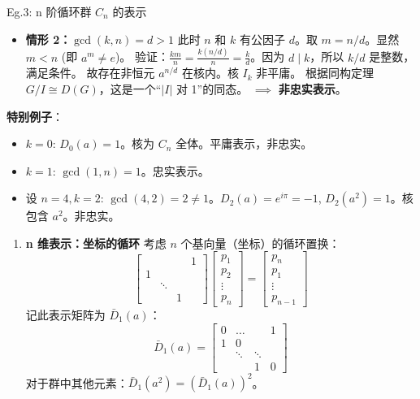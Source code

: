 \begin{example}{Eg.3: n 阶循环群 $C_n$ 的表示}
\begin{enumerate}
\begin{itemize}
        \item \textbf{情形 2：$\gcd(k, n) = d > 1$}
        此时 $n$ 和 $k$ 有公因子 $d$。取 $m = n/d$。显然 $m < n$ (即 $a^m \neq e$)。
        验证：$\frac{k m}{n} = \frac{k (n/d)}{n} = \frac{k}{d}$。因为 $d \mid k$，所以 $k/d$ 是整数，满足条件。
        故存在非恒元 $a^{n/d}$ 在核内。核 $I_k$ 非平庸。
        根据同构定理 $G/I \cong D(G)$，这是一个“$|I|$ 对 1”的同态。
        $\implies$ \textbf{非忠实表示}。
    \end{itemize}
    
    \textbf{特别例子}：
    \begin{itemize}
        \item $k=0$: $D_0(a)=1$。核为 $C_n$ 全体。平庸表示，非忠实。
        \item $k=1$: $\gcd(1, n)=1$。忠实表示。
        \item 设 $n=4, k=2$: $\gcd(4,2)=2 \neq 1$。$D_2(a) = e^{i\pi} = -1$, $D_2(a^2) = 1$。核包含 $a^2$。非忠实。
    \end{itemize}


    \end{enumerate}
    \begin{enumerate}
        \item \textbf{n 维表示：坐标的循环}
    考虑 $n$ 个基向量（坐标）的循环置换：
    \begin{equation}
        \begin{bmatrix} 
             & & & 1 \\ 
            1 & & & \\ 
             & \ddots & & \\ 
             & & 1 & 
        \end{bmatrix} 
        \begin{bmatrix} p_1 \\ p_2 \\ \vdots \\ p_n \end{bmatrix} 
        = 
        \begin{bmatrix} p_n \\ p_1 \\ \vdots \\ p_{n-1} \end{bmatrix}
    \end{equation}
    记此表示矩阵为 $\bar{D}_1(a)$：
    \begin{equation}
        \bar{D}_1(a) = \begin{bmatrix} 
            0 & \dots & & 1 \\ 
            1 & 0 & & \\ 
             & \ddots & \ddots & \\ 
             & & 1 & 0 
        \end{bmatrix}
    \end{equation}
    对于群中其他元素：$\bar{D}_1(a^2) = (\bar{D}_1(a))^2$。


\end{enumerate}
\end{example}
